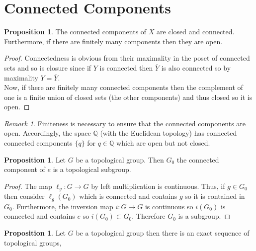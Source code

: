 \documentclass[12pt]{article}
\newcommand{\Q}{\mathbb{Q}}
\theoremstyle{remark}
\newtheorem*{remark}{Remark}
\theoremstyle{definition}
\newtheorem{proposition}[theorem]{Proposition}
\begin{document}
\section{Connected Components}

\begin{proposition}
The connected components of $X$ are closed and connected. Furthermore, if there are finitely many components then they are open.
\end{proposition}

\begin{proof}
Connectedness is obvious from their maximality in the poset of connected sets and so is closure since if $Y$ is connected then $\overline{Y}$ is also connected so by maximality $Y = \overline{Y}$. 
\bigskip\\
Now, if there are finitely many connected components then the complement of one is a finite union of closed sets (the other components) and thus closed so it is open.
\end{proof}

\begin{remark}
Finiteness is necessary to ensure that the connected components are open. Accordingly, the space $\Q$ (with the Euclidean topology) has connected connected components $\{ q \}$ for $q \in \Q$ which are open but not closed. 
\end{remark}


\begin{proposition}
Let $G$ be a topological group. Then $G_0$ the connected component of $e$ is a topological subgroup. 
\end{proposition}

\begin{proof}
The map $\ell_g : G \to G$ by left multiplication is continuous. Thus, if $g \in G_0$ then consider $\ell_{g}(G_0)$ which is connected and contains $g$ so it is contained in $G_0$. Furthermore, the inversion map $i : G \to G$ is continuous so $i(G_0)$ is connected and contains $e$ so $i(G_0) \subset G_0$. Therefore $G_0$ is a subgroup. 
\end{proof}

\begin{proposition}
Let $G$ be a topological group then there is an exact sequence of topological groups,
\begin{center}
\end{center}
\end{proposition}
\end{document}
